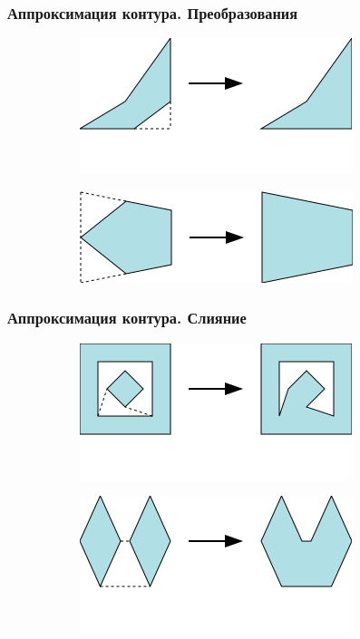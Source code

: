 \documentclass[10pt, unicode]{beamer}
\begin{document}
    \begin{frame}
        \frametitle{Аппроксимация контура. Преобразования}
        \begin{figure}[H]
            \begin{subfigure}[t]{\linewidth}
                \centering
                \includegraphics[scale=0.8]{images/bendneighbor2.png}
            \end{subfigure}
            \begin{subfigure}[t]{\linewidth}
                \centering
                \includegraphics[scale=0.8]{images/bendoutboth.png}
            \end{subfigure}
        \end{figure}
    \end{frame}
    \begin{frame}
        \frametitle{Аппроксимация контура. Слияние}
        \begin{figure}[H]
            \centering
            \begin{subfigure}[t]{\linewidth}
                \centering
                \includegraphics[scale=0.8]{images/polygonmerge.png}
            \end{subfigure}
            \begin{subfigure}[t]{\linewidth}
                \centering
                \includegraphics[scale=0.8]{images/polygonmerge2.png}
            \end{subfigure}
        \end{figure}
    \end{frame}
\end{document}
